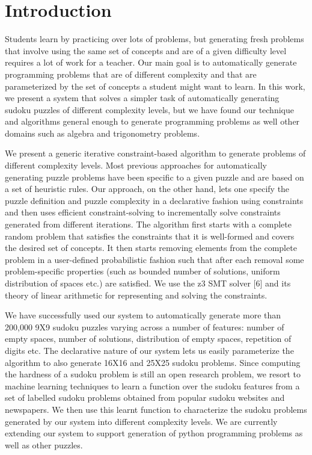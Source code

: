 \section{Introduction}

Students learn by practicing over lots of problems, but generating fresh problems that involve using the same set of concepts and are of a given difficulty level requires a lot of work for a teacher. Our main goal is to automatically generate programming problems that are of different complexity and that are parameterized by the set of concepts a student might want to learn. In this work, we present a system that solves a simpler task of automatically generating sudoku puzzles of different complexity levels, but we have found our technique and algorithms general enough to generate programming problems as well other domains such as algebra and trigonometry problems.

We present a generic iterative constraint-based algorithm to generate problems of different complexity levels. Most previous approaches for automatically generating puzzle problems have been specific to a given puzzle and are based on a set of heuristic rules. Our approach, on the other hand, lets one specify the puzzle definition and puzzle complexity in a declarative fashion using constraints and then uses efficient constraint-solving to incrementally solve constraints generated from different iterations. The algorithm first starts with a complete random problem that satisfies the constraints that it is well-formed and covers the desired set of concepts. It then starts removing elements from the complete problem in a user-defined probabilistic fashion such that after each removal some problem-specific properties (such as bounded number of solutions, uniform distribution of spaces etc.) are satisfied. We use the z3 SMT solver [6] and its theory of linear arithmetic for representing and solving the constraints.

We have successfully used our system to automatically generate more than 200,000 9X9 sudoku puzzles varying across a number of features: number of empty spaces, number of solutions, distribution of empty spaces, repetition of digits etc. The declarative nature of our system lets us easily parameterize the algorithm to also generate 16X16 and 25X25 sudoku problems. Since computing the hardness of a sudoku problem is still an open research problem, we resort to machine learning techniques to learn a function over the sudoku features from a set of labelled sudoku problems obtained from popular sudoku websites and newspapers. We then use this learnt function to characterize the sudoku problems generated by our system into different complexity levels. We are currently extending our system to support generation of python programming problems as well as other puzzles.
